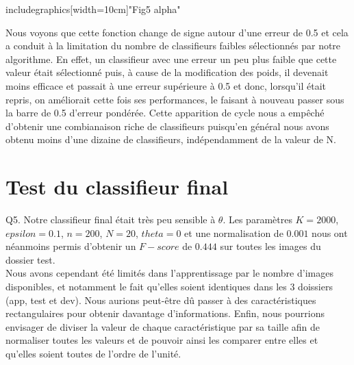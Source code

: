 \documentclass[a4paper,11pt]{article}
\begin{document}
\begin{center}
includegraphics[width=10cm]{"Fig5 alpha"}\\
\end{center}

Nous voyons que cette fonction change de signe autour d’une erreur de 0.5 et cela a conduit à la limitation du nombre de classifieurs faibles sélectionnés par notre algorithme. En effet, un classifieur avec une erreur un peu plus faible que cette valeur était sélectionné puis, à cause de la modification des poids, il devenait moins efficace et passait à une erreur supérieure à 0.5 et donc, lorsqu’il était repris, on améliorait cette fois ses performances, le faisant à nouveau passer sous la barre de 0.5 d’erreur pondérée. Cette apparition de cycle nous a empêché d’obtenir une combianaison riche de classifieurs puisqu’en général nous avons obtenu moins d’une dizaine de classifieurs, indépendamment de la valeur de N.\\

\section{Test du classifieur final}

Q5. Notre classifieur final était très peu sensible à $\theta$. Les paramètres $K=2000$, $epsilon = 0.1$, $n = 200$, $N = 20$, $theta = 0$ et une normalisation de $0.001$ nous ont néanmoins permis d’obtenir un $F-score$ de $0.444$ sur toutes les images du dossier test.\\

Nous avons cependant été limités dans l’apprentissage par le nombre d’images disponibles, et notamment le fait qu’elles soient identiques dans les 3 doissiers (app, test et dev). Nous aurions peut-être dû passer à des caractéristiques rectangulaires pour obtenir davantage d’informations. Enfin, nous pourrions envisager de diviser la valeur de chaque caractéristique par sa taille afin de normaliser toutes les valeurs et de pouvoir ainsi les comparer entre elles et qu’elles soient toutes de l’ordre de l’unité.
\end{document}
